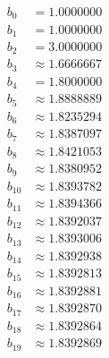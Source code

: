 \documentclass{article}
\begin{document}
\begin{preview}
\begin{align*}
b_{0} &= 1.0000000\\
b_{1} &= 1.0000000\\
b_{2} &= 3.0000000\\
b_{3} &\approx 1.6666667\\
b_{4} &= 1.8000000\\
b_{5} &\approx 1.8888889\\
b_{6} &\approx 1.8235294\\
b_{7} &\approx 1.8387097\\
b_{8} &\approx 1.8421053\\
b_{9} &\approx 1.8380952\\
b_{10} &\approx 1.8393782\\
b_{11} &\approx 1.8394366\\
b_{12} &\approx 1.8392037\\
b_{13} &\approx 1.8393006\\
b_{14} &\approx 1.8392938\\
b_{15} &\approx 1.8392813\\
b_{16} &\approx 1.8392881\\
b_{17} &\approx 1.8392870\\
b_{18} &\approx 1.8392864\\
b_{19} &\approx 1.8392869
\end{align*}
\end{preview}
\end{document}
